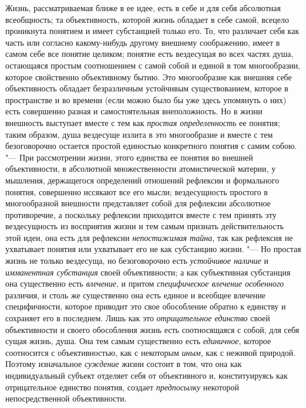 {{Жизнь, рассматриваемая ближе в ее идее, есть в себе и для себя
абсолютная всеобщность; та объективность, которой жизнь обладает в себе
самой, всецело проникнута понятием и имеет субстанцией только его. То, что
различает себя как часть или согласно какому-нибудь другому внешнему
соображению, имеет в самом себе все понятие целиком; понятие есть
вездесущая во всех частях душа, остающаяся простым соотношением с самой
собой и единой в том многообразии, которое свойственно объективному бытию.
Это многообразие как внешняя себе объективность обладает безразличным
устойчивым существованием, которое в пространстве и во времени (если можно
было бы уже здесь упомянуть о них) есть совершенно разная и самостоятельная
внеположность. Но в жизни внешность выступает вместе с тем как
{\em простая определенность}
ее понятия; таким образом, душа вездесуще излита в это
многообразие и вместе с тем безоговорочно остается простой единостью
конкретного понятия с самим собою. "--- При рассмотрении жизни,
этого единства ее понятия во внешней объективности, в абсолютной
множественности атомистической материи, у мышления,
держащегося определений отношений рефлексии и формального понятия,
совершенно иссякают все его мысли; вездесущность простого в многообразной
внешности представляет собой для рефлексии абсолютное противоречие, а
поскольку рефлексии приходится вместе с тем принять эту вездесущность из
восприятия жизни и тем самым признать действительность этой идеи, она есть
для рефлексии {\em непостижимая тайна},
так как рефлексия не ухватывает понятия или ухватывает его не
как субстанцию жизни. "--- Но простая жизнь не только
вездесуща, но безоговорочно есть
{\em устойчивое наличие}
и {\em имманентная
субстанция} своей объективности; а как субъективная
субстанция она существенно есть
{\em влечение}, и притом
{\em специфическое влечение особенного}
различия, и столь же существенно она есть единое и всеобщее
влечение специфичности, которое приводит это свое обособление обратно к
единству и сохраняет его в последнем. Лишь как это
{\em отрицательное единство}
своей объективности и своего обособления жизнь есть
соотносящаяся с собой, для себя сущая жизнь, душа. Она тем самым
существенно есть {\em единичное},
которое соотносится с объективностью, как с некоторым {\em иным},
как с неживой природой. Поэтому изначальное
{\em суждение}
жизни состоит в том, что она как индивидуальный субъект
отделяет себя от объективного и, конституируясь как отрицательное единство
понятия, создает {\em предпосылку}
некоторой непосредственной объективности.

}}
